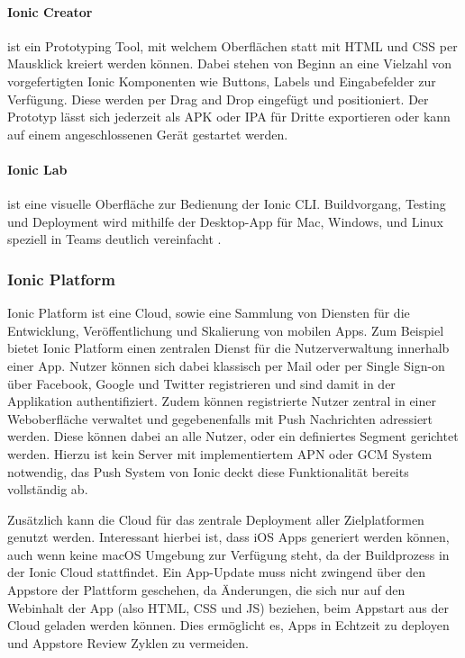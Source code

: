 \paragraph{Ionic Creator}
ist ein Prototyping Tool, mit welchem Oberflächen statt
mit HTML und CSS per Mausklick kreiert werden können.
Dabei stehen von Beginn an eine Vielzahl von vorgefertigten Ionic Komponenten wie Buttons,
Labels und Eingabefelder zur Verfügung.
Diese werden per Drag and Drop eingefügt und positioniert. Der Prototyp lässt sich jederzeit
als \ac{APK} oder \ac{IPA} für Dritte exportieren oder kann auf einem angeschlossenen Gerät gestartet werden.

\paragraph{Ionic Lab}
ist eine visuelle Oberfläche zur Bedienung der Ionic \ac{CLI}.
Buildvorgang, Testing und Deployment wird mithilfe der Desktop-App für Mac, Windows, und
Linux speziell in Teams deutlich vereinfacht \cite{Ionic75:online}.

\subsubsection{Ionic Platform}

Ionic Platform ist eine Cloud, sowie eine Sammlung von Diensten für die Entwicklung,
Veröffentlichung und Skalierung von mobilen Apps. Zum Beispiel bietet Ionic Platform einen zentralen Dienst für die Nutzerverwaltung innerhalb einer App.
Nutzer können sich dabei klassisch per Mail oder per Single Sign-on über
Facebook, Google und Twitter registrieren und sind damit in der Applikation authentifiziert.
Zudem können registrierte Nutzer zentral in einer Weboberfläche verwaltet und gegebenenfalls mit Push Nachrichten adressiert werden.
Diese können dabei an alle Nutzer, oder ein definiertes Segment gerichtet werden.
Hierzu ist kein Server mit implementiertem \ac{APN} oder \ac{GCM} System notwendig, das Push System von Ionic deckt diese
Funktionalität bereits vollständig ab.

Zusätzlich kann die Cloud für das zentrale Deployment aller Zielplatformen genutzt werden.
Interessant hierbei ist, dass iOS Apps generiert werden können, auch wenn
keine macOS Umgebung zur Verfügung steht, da der Buildprozess in der Ionic Cloud stattfindet.
Ein App-Update muss nicht zwingend über den Appstore der Plattform geschehen,
da Änderungen, die sich nur auf den Webinhalt der App (also HTML, CSS und JS) beziehen,
beim Appstart aus der Cloud geladen werden können.
Dies ermöglicht es, Apps in Echtzeit zu deployen und Appstore Review Zyklen zu vermeiden.


